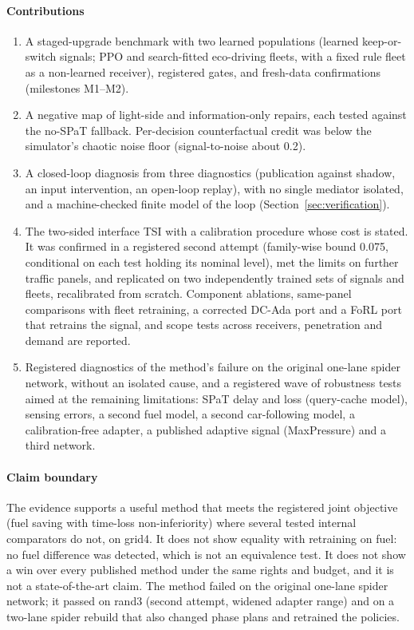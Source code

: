 \paragraph{Contributions}
\begin{enumerate}\setlength\itemsep{1pt}
\item A staged-upgrade benchmark with two learned populations (learned keep-or-switch signals; PPO and search-fitted eco-driving fleets,
with a fixed rule fleet as a non-learned receiver), registered gates, and fresh-data confirmations (milestones M1--M2).
\item A negative map of light-side and information-only repairs, each tested against the no-SPaT fallback. Per-decision counterfactual
credit was below the simulator's chaotic noise floor (signal-to-noise about 0.2).
\item A closed-loop diagnosis from three diagnostics (publication against shadow, an input intervention, an open-loop replay), with no
single mediator isolated, and a machine-checked finite model of the loop (Section~\ref{sec:verification}).
\item The two-sided interface TSI with a calibration procedure whose cost is stated. It was confirmed in a registered second attempt
(family-wise bound 0.075, conditional on each test holding its nominal level), met the limits on further traffic panels, and replicated
on two independently trained sets of signals and fleets, recalibrated from scratch. Component ablations, same-panel comparisons with fleet retraining, a corrected DC-Ada port and a FoRL port that retrains the signal, and scope
tests across receivers, penetration and demand are reported.
\item Registered diagnostics of the method's failure on the original one-lane spider network, without an isolated cause, and a registered wave of robustness tests aimed at the
remaining limitations: SPaT delay and loss (query-cache model), sensing errors, a second fuel model, a second car-following model, a calibration-free
adapter, a published adaptive signal (MaxPressure) and a third network.
\end{enumerate}

\paragraph{Claim boundary} The evidence supports a useful method that meets the registered joint objective (fuel saving with
time-loss non-inferiority) where several tested internal comparators do not, on grid4. It does not show
equality with retraining on fuel: no fuel difference was detected, which is not an equivalence test. It does not show a win over every
published method under the same rights and budget, and it is not a state-of-the-art claim. The method failed on the original one-lane
spider network; it passed on rand3 (second attempt, widened adapter range) and on a two-lane spider rebuild that also changed phase plans
and retrained the policies.

